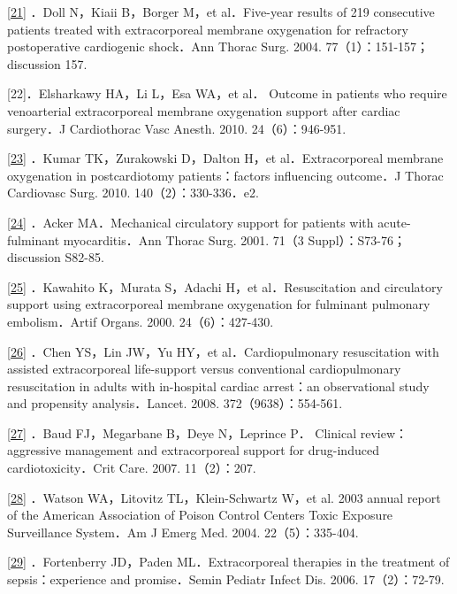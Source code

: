 \protect\hyperlink{text00030.htmlux5cux23ch21-29-back}{{[}21{]}} ．Doll
N，Kiaii B，Borger M，et al．Five-year results of 219 consecutive
patients treated with extracorporeal membrane oxygenation for refractory
postoperative cardiogenic shock．Ann Thorac Surg. 2004.
77（1）：151-157；discussion 157.

{[}22{]}．Elsharkawy HA，Li L，Esa WA，et al． Outcome in patients who
require venoarterial extracorporeal membrane oxygenation support after
cardiac surgery．J Cardiothorac Vasc Anesth. 2010. 24（6）：946-951.

\protect\hyperlink{text00030.htmlux5cux23ch23-29-back}{{[}23{]}} ．Kumar
TK，Zurakowski D，Dalton H，et al．Extracorporeal membrane oxygenation
in postcardiotomy patients：factors influencing outcome．J Thorac
Cardiovasc Surg. 2010. 140（2）：330-336．e2.

\protect\hyperlink{text00030.htmlux5cux23ch24-29-back}{{[}24{]}} ．Acker
MA．Mechanical circulatory support for patients with acute-fulminant
myocarditis．Ann Thorac Surg. 2001. 71（3 Suppl）：S73-76；discussion
S82-85.

\protect\hyperlink{text00030.htmlux5cux23ch25-29-back}{{[}25{]}}
．Kawahito K，Murata S，Adachi H，et al．Resuscitation and circulatory
support using extracorporeal membrane oxygenation for fulminant
pulmonary embolism．Artif Organs. 2000. 24（6）：427-430.

\protect\hyperlink{text00030.htmlux5cux23ch26-29-back}{{[}26{]}} ．Chen
YS，Lin JW，Yu HY，et al．Cardiopulmonary resuscitation with assisted
extracorporeal life-support versus conventional cardiopulmonary
resuscitation in adults with in-hospital cardiac arrest：an
observational study and propensity analysis．Lancet. 2008.
372（9638）：554-561.

\protect\hyperlink{text00030.htmlux5cux23ch27-29-back}{{[}27{]}} ．Baud
FJ，Megarbane B，Deye N，Leprince P． Clinical review：aggressive
management and extracorporeal support for drug-induced
cardiotoxicity．Crit Care. 2007. 11（2）：207.

\protect\hyperlink{text00030.htmlux5cux23ch28-29-back}{{[}28{]}}
．Watson WA，Litovitz TL，Klein-Schwartz W，et al. 2003 annual report of
the American Association of Poison Control Centers Toxic Exposure
Surveillance System．Am J Emerg Med. 2004. 22（5）：335-404.

\protect\hyperlink{text00030.htmlux5cux23ch29-29-back}{{[}29{]}}
．Fortenberry JD，Paden ML．Extracorporeal therapies in the treatment of
sepsis：experience and promise．Semin Pediatr Infect Dis. 2006.
17（2）：72-79.

